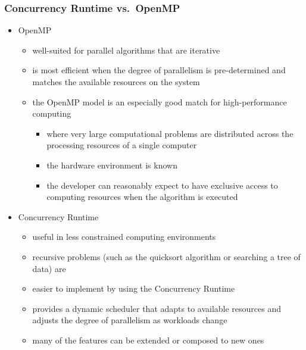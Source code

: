 \hypertarget{concurrency-runtime-vs.openmp}{%
\subsubsection{Concurrency Runtime
vs.~OpenMP}\label{concurrency-runtime-vs.openmp}}

\begin{itemize}
\tightlist
\item
  OpenMP

  \begin{itemize}
  \tightlist
  \item
    well-suited for parallel algorithms that are iterative
  \item
    is most efficient when the degree of parallelism is pre-determined
    and matches the available resources on the system
  \item
    the OpenMP model is an especially good match for high-performance
    computing

    \begin{itemize}
    \tightlist
    \item
      where very large computational problems are distributed across the
      processing resources of a single computer
    \item
      the hardware environment is known
    \item
      the developer can reasonably expect to have exclusive access to
      computing resources when the algorithm is executed
    \end{itemize}
  \end{itemize}
\item
  Concurrency Runtime

  \begin{itemize}
  \tightlist
  \item
    useful in less constrained computing environments
  \item
    recursive problems (such as the quicksort algorithm or searching a
    tree of data) are
  \item
    easier to implement by using the Concurrency Runtime
  \item
    provides a dynamic scheduler that adapts to available resources and
    adjusts the degree of parallelism as workloads change
  \item
    many of the features can be extended or composed to new ones
  \end{itemize}
\end{itemize}

